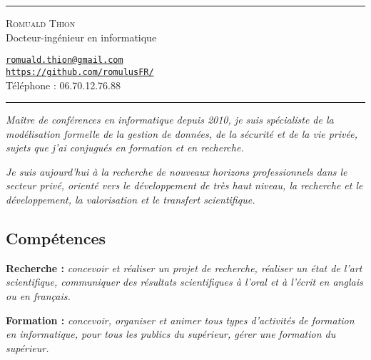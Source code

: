 \documentclass[12pt,a4paper]{article}
\newcommand{\hr}{\textcolor{gris80}{\rule{\linewidth}{0.5pt}}}
\newcommand{\activite}[1]{\textbf{#1}\xspace}
\newcommand{\comment}[1]{\textsl{#1}\xspace}
\begin{document}
\hr

\vspace{0.5em}

\begin{minipage}[c]{0.5\textwidth}
  \begin{center}
    {\LARGE\textsc{Romuald Thion}}\\
    Docteur-ingénieur en informatique\\
  \end{center}
\end{minipage}
\begin{minipage}[c]{0.5\textwidth}
  \begin{center}
    \href{mailto:romuald.thion@gmail.com}{\nolinkurl{romuald.thion@gmail.com}}\\
    \href{https://github.com/romulusFR/}{\nolinkurl{https://github.com/romulusFR/}}\\
    Téléphone : 06.70.12.76.88\\
  \end{center}
\end{minipage}

\vspace{0.5em}

\hr

\begin{center}
  \emph{Maître de conférences en informatique depuis 2010, je suis spécialiste de la modélisation formelle de la gestion de données, de la sécurité et de la vie privée, sujets que j'ai conjugués en formation et en recherche.}

  \emph{Je suis aujourd'hui à la recherche de nouveaux horizons professionnels dans le secteur privé, orienté vers le développement de très haut niveau, la recherche et le développement, la valorisation et le transfert scientifique.}
\end{center}

\subsection*{Compétences}

  \activite{Recherche :}
  \comment{concevoir et réaliser un projet de recherche, réaliser un état de l'art scientifique, communiquer des résultats scientifiques à l'oral et à l'écrit en anglais ou en français.}

  \activite{Formation :}
  \comment{concevoir, organiser et animer tous types d'activités de formation en informatique, pour tous les publics du supérieur, gérer une formation du supérieur.}
\end{document}
